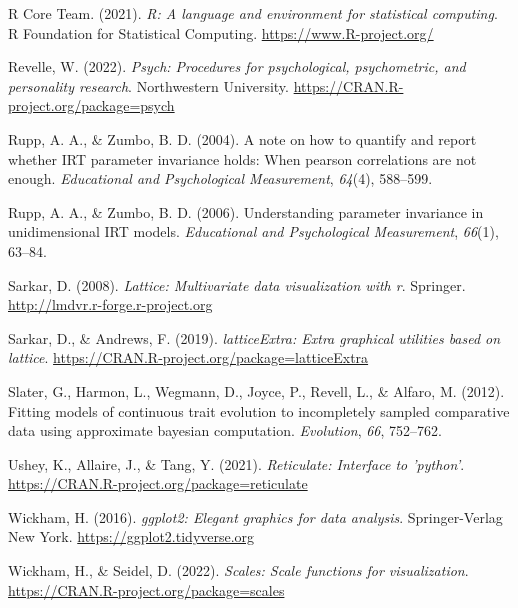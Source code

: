 \documentclass[
  man]{apa6}
\newlength{\cslhangindent}
\newlength{\cslentryspacingunit} %
\newenvironment{CSLReferences}[2] %
 {%
  \setlength{\parindent}{0pt}
  \ifodd #1
  \let\oldpar\par
  \def\par{\hangindent=\cslhangindent\oldpar}
  \fi
  \setlength{\parskip}{#2\cslentryspacingunit}
 }%
 {}
\begin{document}
\begin{CSLReferences}{1}{0}
\leavevmode{}%
R Core Team. (2021). \emph{R: A language and environment for statistical computing}. R Foundation for Statistical Computing. \url{https://www.R-project.org/}

\leavevmode{}%
Revelle, W. (2022). \emph{Psych: Procedures for psychological, psychometric, and personality research}. Northwestern University. \url{https://CRAN.R-project.org/package=psych}

\leavevmode{}%
Rupp, A. A., \& Zumbo, B. D. (2004). A note on how to quantify and report whether IRT parameter invariance holds: When pearson correlations are not enough. \emph{Educational and Psychological Measurement}, \emph{64}(4), 588--599.

\leavevmode{}%
Rupp, A. A., \& Zumbo, B. D. (2006). Understanding parameter invariance in unidimensional IRT models. \emph{Educational and Psychological Measurement}, \emph{66}(1), 63--84.

\leavevmode{}%
Sarkar, D. (2008). \emph{Lattice: Multivariate data visualization with r}. Springer. \url{http://lmdvr.r-forge.r-project.org}

\leavevmode{}%
Sarkar, D., \& Andrews, F. (2019). \emph{latticeExtra: Extra graphical utilities based on lattice}. \url{https://CRAN.R-project.org/package=latticeExtra}

\leavevmode{}%
Slater, G., Harmon, L., Wegmann, D., Joyce, P., Revell, L., \& Alfaro, M. (2012). Fitting models of continuous trait evolution to incompletely sampled comparative data using approximate bayesian computation. \emph{Evolution}, \emph{66}, 752--762.

\leavevmode{}%
Ushey, K., Allaire, J., \& Tang, Y. (2021). \emph{Reticulate: Interface to 'python'}. \url{https://CRAN.R-project.org/package=reticulate}

\leavevmode{}%
Wickham, H. (2016). \emph{ggplot2: Elegant graphics for data analysis}. Springer-Verlag New York. \url{https://ggplot2.tidyverse.org}

\leavevmode{}%
Wickham, H., \& Seidel, D. (2022). \emph{Scales: Scale functions for visualization}. \url{https://CRAN.R-project.org/package=scales}

\end{CSLReferences}
\end{document}
